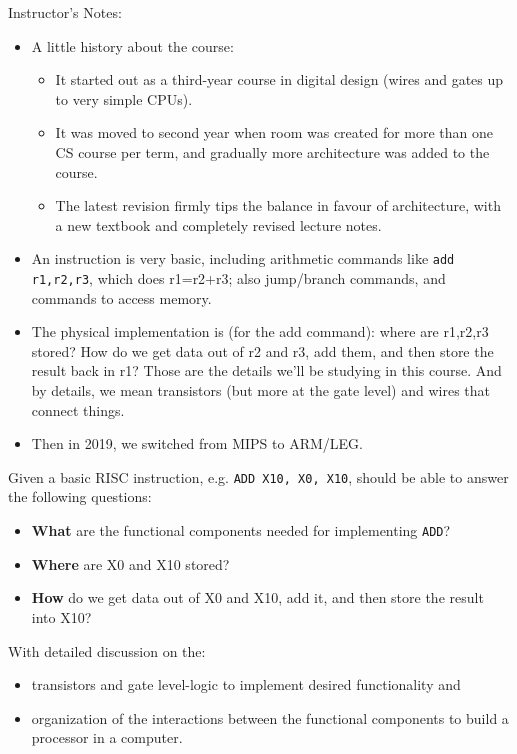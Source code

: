 \BNotes\ifnum{}
\begin{frame}[fragile]
Instructor's Notes:

\begin{itemize}
    \item A little history about the course:
    \begin{itemize}
        \item It started out as a third-year course in digital design (wires and gates up to
very simple CPUs). 
    \item It was moved to second year when room was created
for more than one CS course per term, and gradually more architecture
was added to the course. 
    \item The latest revision firmly tips the balance
	in favour of architecture, with a new textbook and completely revised
	lecture notes.
    \end{itemize}
    \item An instruction is very basic, including arithmetic commands
	like \texttt{add r1,r2,r3}, which does r1=r2+r3;
	 also jump/branch commands, and commands to access memory.
    \item The physical implementation is (for the add command): where are
    	r1,r2,r3 stored?  How do we get data out of r2 and r3, add them, and
	then store the result back in r1?  Those are the details we'll be
	studying in this course.  And by details, we mean transistors (but
	more at the gate level) and wires that connect things.
    \item Then in 2019, we switched from MIPS to ARM/LEG.
\end{itemize}
\end{frame}
\fi\ENotes

\begin{frame}[fragile]
    \begin{multicols}{2}
        \columnbreak
        {\footnotesize
        Given a basic RISC instruction, e.g. \texttt{ADD X10, X0, X10}, should be able to answer the following questions: 
    \begin{itemize}
        \item 	\textbf{What} are the functional components needed for implementing \texttt{ADD}?
        \item \textbf{Where} are X0 and X10 stored?
        \item \textbf{How} do we get data out of X0 and X10, add it, and
	then store the result into X10?
     \end{itemize}
 With detailed discussion on the:
 \begin{itemize}
     \item transistors and gate level-logic to implement desired functionality and 
     \item organization of the interactions between the functional components to build a processor in a computer.
 \end{itemize}
 }
    \end{multicols}
    
\end{frame}

